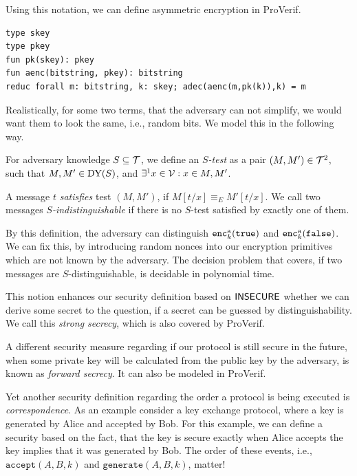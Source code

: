Using this notation, we can define asymmetric encryption in ProVerif.

\begin{lstlisting}
type skey
type pkey
fun pk(skey): pkey
fun aenc(bitstring, pkey): bitstring
reduc forall m: bitstring, k: skey; adec(aenc(m,pk(k)),k) = m
\end{lstlisting}

Realistically, for some two terms, that the adversary can not simplify, we would want them to look the same, i.e., random bits.
We model this in the following way.

\begin{definition}
    For adversary knowledge \(S \subseteq \mathcal{T}\), we define an \(S\)\emph{-test} as a pair \((M, M') \in \mathcal{T}^2\), such that \(M, M' \in \text{DY}(S)\), and \(\exists^1 x \in \mathcal{V}: x \in M, M'\).

    A message \(t\) \emph{satisfies} test \((M, M')\), if \(M[t/x] \equiv_E M'[t/x]\).
    We call two messages \(S\)\emph{-indistinguishable} if there is no \(S\)-test satisfied by exactly one of them.
\end{definition}

By this definition, the adversary can distinguish \(\texttt{enc}^\text{a}_k(\texttt{true})\) and \(\texttt{enc}^\text{a}_k(\texttt{false})\).
We can fix this, by introducing random nonces into our encryption primitives which are not known by the adversary.
The decision problem that covers, if two messages are \(S\)-distinguishable, is decidable in polynomial time.

This notion enhances our security definition based on \(\textsf{INSECURE}\) whether we can derive some secret to the question, if a secret can be guessed by distinguishability.
We call this \emph{strong secrecy}, which is also covered by ProVerif.

A different security measure regarding if our protocol is still secure in the future, when some private key will be calculated from the public key by the adversary, is known as \emph{forward secrecy}.
It can also be modeled in ProVerif.

Yet another security definition regarding the order a protocol is being executed is \emph{correspondence}.
As an example consider a key exchange protocol, where a key is generated by Alice and accepted by Bob.
For this example, we can define a security based on the fact, that the key is secure exactly when Alice accepts the key implies that it was generated by Bob.
The order of these events, i.e., \(\texttt{accept}(A, B, k)\) and \(\texttt{generate}(A, B, k)\), matter!
